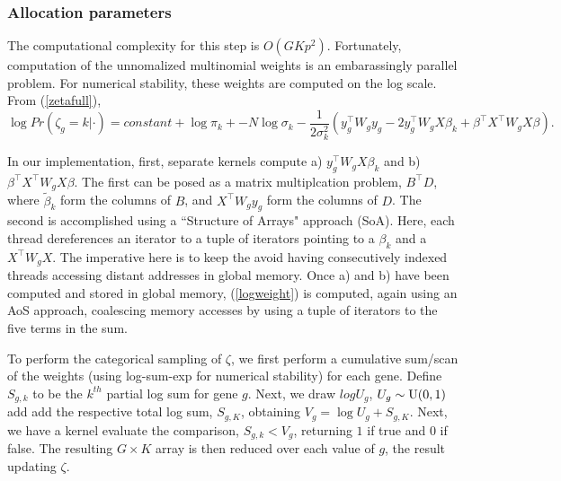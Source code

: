 \subsubsection{Allocation parameters}
The computational complexity for this step is $O(GKp^2)$. Fortunately, computation of the unnomalized multinomial weights is an embarassingly parallel problem. For numerical stability, these weights are computed on the log scale. From (\ref{zetafull}),
\begin{equation}
\label{logweight}
\log Pr(\zeta_g=k|\cdot) = constant + \log \pi_k + -N \log \sigma_k - \frac{1}{2\sigma^2_k}\left(y_g^\top W_g y_g - 2y_g^\top W_g X \beta_k + \beta^\top X^\top W_g X \beta \right).
\end{equation}

In our implementation, first, separate kernels compute a) $y_g^\top W_g X \beta_k$ and b) $\beta^\top X^\top W_g X \beta$. The first can be posed as a matrix multiplcation problem, $B^\top D$, where $\tilde{\beta}_k$ form the columns of $B$, and $X^\top W_g y_g$ form the columns of $D$. The second is accomplished using a ``Structure of Arrays" approach (SoA). Here, each thread dereferences an iterator to a tuple of iterators pointing to a $\beta_k$ and a $X^\top W_g X$. The imperative here is to keep the avoid having consecutively indexed threads accessing distant addresses in global memory. Once a) and b) have been computed and stored in global memory, (\ref{logweight}) is computed, again using an AoS approach, coalescing memory accesses by using a tuple of iterators to the five terms in the sum.

To perform the categorical sampling of $\zeta$, we first perform a cumulative sum/scan of the weights (using log-sum-exp for numerical stability) for each gene. Define $S_{g,k}$ to be the $k^{th}$ partial log sum for gene $g$. Next, we draw $log U_g$, $U_g \sim \operatorname{U}(0,1)$ add add the respective total log sum, $S_{g,K}$, obtaining $V_g = \log U_g + S_{g,K}$. Next, we have a kernel evaluate the comparison, $S_{g,k}<V_g$, returning $1$ if true and $0$ if false. The resulting $G\times K$ array is then reduced over each value of $g$, the result updating $\zeta$.

